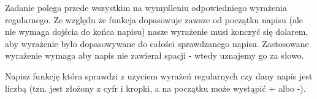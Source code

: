 Zadanie polega przede wszystkim na wymyśleniu odpowiedniego wyrażenia regularnego.
Ze względu że funkcja  dopasowuje zawsze od początku napisu (ale nie wymaga dojścia do końca napisu) nasze wyrażenie musi konczyć się dolarem,
aby wyrażenie było dopasowywane do całości sprawdzanego napisu.
Zastosowane wyrażenie wymaga aby napis nie zawierał spacji - wtedy uznajemy go za słowo.
\fi

\dbEntryCheckResults
Napisz funkcję która sprawdzi z użyciem wyrażeń regularnych czy dany napis jest liczbą (tzn. jest złożony z cyfr i kropki, a na początku może wystąpić + albo -).
\fi
{}\dbEntryCheckResults
{}
\fi
